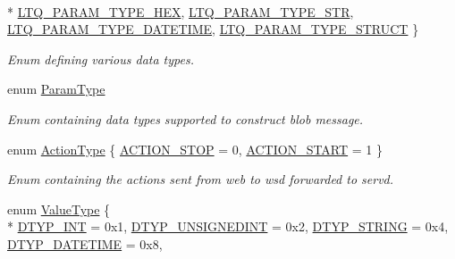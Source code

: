 \begin{DoxyCompactItemize}
\\*
\hyperlink{group__LIBHELP_ggaf878e044f6bcefab8a0bfc6468814811a1d3dbfbf8a44738de201ac500f496f83}{L\-T\-Q\-\_\-\-P\-A\-R\-A\-M\-\_\-\-T\-Y\-P\-E\-\_\-\-H\-E\-X}, 
\hyperlink{group__LIBHELP_ggaf878e044f6bcefab8a0bfc6468814811a4c338e29ee28a9764c5e50c05bee0204}{L\-T\-Q\-\_\-\-P\-A\-R\-A\-M\-\_\-\-T\-Y\-P\-E\-\_\-\-S\-T\-R}, 
\hyperlink{group__LIBHELP_ggaf878e044f6bcefab8a0bfc6468814811aa0d084e1103f1400b632bfc4e0c7e8df}{L\-T\-Q\-\_\-\-P\-A\-R\-A\-M\-\_\-\-T\-Y\-P\-E\-\_\-\-D\-A\-T\-E\-T\-I\-M\-E}, 
\hyperlink{group__LIBHELP_ggaf878e044f6bcefab8a0bfc6468814811a92c3af8fd9e67a1cc40fa40d49dcec20}{L\-T\-Q\-\_\-\-P\-A\-R\-A\-M\-\_\-\-T\-Y\-P\-E\-\_\-\-S\-T\-R\-U\-C\-T}
 \}
\begin{DoxyCompactList}\small\item\em Enum defining various data types. \end{DoxyCompactList}\item 
enum \hyperlink{group__LIBHELP_ga3a023c0c27667e78ae521eb64f1c7c81}{Param\-Type} 
\begin{DoxyCompactList}\small\item\em Enum containing data types supported to construct blob message. \end{DoxyCompactList}\item 
enum \hyperlink{group__LIBHELP_ga21d5e8f8cdaa838586b31007df0a950b}{Action\-Type} \{ \hyperlink{group__LIBHELP_gga21d5e8f8cdaa838586b31007df0a950ba4645d70cb9bb2228f230d601f477639d}{A\-C\-T\-I\-O\-N\-\_\-\-S\-T\-O\-P} = 0, 
\hyperlink{group__LIBHELP_gga21d5e8f8cdaa838586b31007df0a950bad18d9bd6c0a4eced8d31c7b1c6b9dd16}{A\-C\-T\-I\-O\-N\-\_\-\-S\-T\-A\-R\-T} = 1
 \}
\begin{DoxyCompactList}\small\item\em Enum containing the actions sent from web to wsd forwarded to servd. \end{DoxyCompactList}\item 
enum \hyperlink{group__LIBHELP_gad9971b6ef33e02ba2c75d19c1d2518a1}{Value\-Type} \{ \\*
\hyperlink{group__LIBHELP_ggad9971b6ef33e02ba2c75d19c1d2518a1a5e2046a67c43b44453d1345083ddb0a8}{D\-T\-Y\-P\-\_\-\-I\-N\-T} = 0x1, 
\hyperlink{group__LIBHELP_ggad9971b6ef33e02ba2c75d19c1d2518a1a83acad6b2208aba94e443817f260a97d}{D\-T\-Y\-P\-\_\-\-U\-N\-S\-I\-G\-N\-E\-D\-I\-N\-T} = 0x2, 
\hyperlink{group__LIBHELP_ggad9971b6ef33e02ba2c75d19c1d2518a1ae7f1c03f67e4477bca8c3e0b36b7022c}{D\-T\-Y\-P\-\_\-\-S\-T\-R\-I\-N\-G} = 0x4, 
\hyperlink{group__LIBHELP_ggad9971b6ef33e02ba2c75d19c1d2518a1a2271764ae7fc34b395cc47fd4aacfbf8}{D\-T\-Y\-P\-\_\-\-D\-A\-T\-E\-T\-I\-M\-E} = 0x8, 

\end{DoxyCompactItemize}
